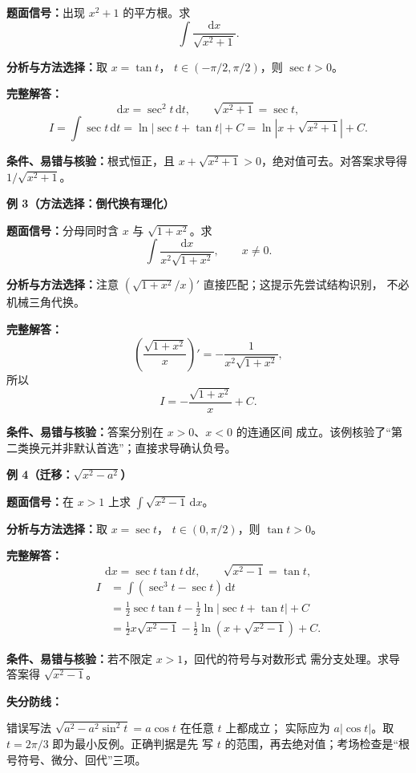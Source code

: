 \begin{knowledgeBox}
\textbf{题面信号：}出现 \(x^2+1\) 的平方根。求
\[
\int\frac{\mathrm dx}{\sqrt{x^2+1}}.
\]

\textbf{分析与方法选择：}取 \(x=\tan t\)，
\(t\in(-\pi/2,\pi/2)\)，则 \(\sec t>0\)。

\textbf{完整解答：}
\[
\mathrm dx=\sec^2t\,\mathrm dt,\qquad
\sqrt{x^2+1}=\sec t,
\]
\[
I=\int\sec t\,\mathrm dt
=\ln|\sec t+\tan t|+C
=\ln\left|x+\sqrt{x^2+1}\right|+C.
\]

\textbf{条件、易错与核验：}根式恒正，且
\(x+\sqrt{x^2+1}>0\)，绝对值可去。对答案求导得
\(1/\sqrt{x^2+1}\)。

\textbf{例 3（方法选择：倒代换有理化）}

\textbf{题面信号：}分母同时含 \(x\) 与 \(\sqrt{1+x^2}\)。求
\[
\int\frac{\mathrm dx}{x^2\sqrt{1+x^2}},\qquad x\ne0.
\]

\textbf{分析与方法选择：}注意
\(\left(\sqrt{1+x^2}/x\right)'\) 直接匹配；这提示先尝试结构识别，
不必机械三角代换。

\textbf{完整解答：}
\[
\left(\frac{\sqrt{1+x^2}}x\right)'
=-\frac1{x^2\sqrt{1+x^2}},
\]
所以
\[
I=-\frac{\sqrt{1+x^2}}x+C.
\]

\textbf{条件、易错与核验：}答案分别在 \(x>0\)、\(x<0\) 的连通区间
成立。该例核验了“第二类换元并非默认首选”；直接求导确认负号。

\textbf{例 4（迁移：\(\sqrt{x^2-a^2}\)）}

\textbf{题面信号：}在 \(x>1\) 上求
\(\int\sqrt{x^2-1}\,\mathrm dx\)。

\textbf{分析与方法选择：}取 \(x=\sec t\)，
\(t\in(0,\pi/2)\)，则 \(\tan t>0\)。

\textbf{完整解答：}
\[
\mathrm dx=\sec t\tan t\,\mathrm dt,\qquad
\sqrt{x^2-1}=\tan t,
\]
\[
\begin{aligned}
I&=\int(\sec^3t-\sec t)\,\mathrm dt\\
&=\frac12\sec t\tan t-\frac12\ln|\sec t+\tan t|+C\\
&=\frac12x\sqrt{x^2-1}
-\frac12\ln\left(x+\sqrt{x^2-1}\right)+C.
\end{aligned}
\]

\textbf{条件、易错与核验：}若不限定 \(x>1\)，回代的符号与对数形式
需分支处理。求导答案得 \(\sqrt{x^2-1}\)。

\textbf{失分防线：}

错误写法 \(\sqrt{a^2-a^2\sin^2t}=a\cos t\) 在任意 \(t\) 上都成立；
实际应为 \(a|\cos t|\)。取 \(t=2\pi/3\) 即为最小反例。正确判据是先
写 \(t\) 的范围，再去绝对值；考场检查是“根号符号、微分、回代”三项。


\end{knowledgeBox}
